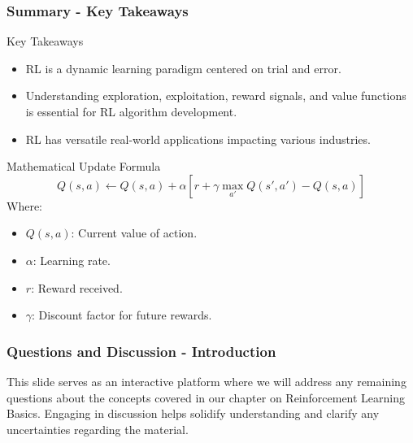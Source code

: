 \documentclass[aspectratio=169]{beamer}
\begin{document}
\begin{frame}[fragile]
    \frametitle{Summary - Key Takeaways}
    \begin{block}{Key Takeaways}
        \begin{itemize}
            \item RL is a dynamic learning paradigm centered on trial and error.
            \item Understanding exploration, exploitation, reward signals, and value functions is essential for RL algorithm development.
            \item RL has versatile real-world applications impacting various industries.
        \end{itemize}
    \end{block}
    
    \begin{block}{Mathematical Update Formula}
        \begin{equation}
            Q(s, a) \leftarrow Q(s, a) + \alpha \left[r + \gamma \max_{a'} Q(s', a') - Q(s, a)\right]
        \end{equation}
        Where:
        \begin{itemize}
            \item $Q(s, a)$: Current value of action.
            \item $\alpha$: Learning rate.
            \item $r$: Reward received.
            \item $\gamma$: Discount factor for future rewards.
        \end{itemize}
    \end{block}
\end{frame}

\begin{frame}[fragile]
  \frametitle{Questions and Discussion - Introduction}
  This slide serves as an interactive platform where we will address any remaining questions about the concepts covered in our chapter on Reinforcement Learning Basics. 
  Engaging in discussion helps solidify understanding and clarify any uncertainties regarding the material.
\end{frame}
\end{document}
